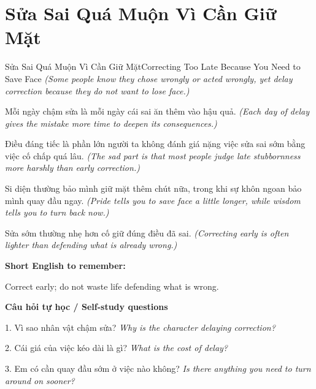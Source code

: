 \section{Sửa Sai Quá Muộn Vì Cần Giữ Mặt}
\begin{truyen}{Sửa Sai Quá Muộn Vì Cần Giữ Mặt}{Correcting Too Late Because You Need to Save Face}
\textit{(Some people know they chose wrongly or acted wrongly, yet delay correction because they do not want to lose face.)}

Mỗi ngày chậm sửa là mỗi ngày cái sai ăn thêm vào hậu quả.
\textit{(Each day of delay gives the mistake more time to deepen its consequences.)}

Điều đáng tiếc là phần lớn người ta không đánh giá nặng việc sửa sai sớm bằng việc cố chấp quá lâu.
\textit{(The sad part is that most people judge late stubbornness more harshly than early correction.)}

Si diện thường bảo mình giữ mặt thêm chút nữa, trong khi sự khôn ngoan bảo mình quay đầu ngay.
\textit{(Pride tells you to save face a little longer, while wisdom tells you to turn back now.)}

\end{truyen}

\begin{baihoc}
Sửa sớm thường nhẹ hơn cố giữ đúng điều đã sai.
\textit{(Correcting early is often lighter than defending what is already wrong.)}
\end{baihoc}

\begin{ghinhoanh}
\textbf{Short English to remember:}

Correct early; do not waste life defending what is wrong.

\end{ghinhoanh}

\begin{tuhocnhanh}
\textbf{Câu hỏi tự học / Self-study questions}

1. Vì sao nhân vật chậm sửa? \textit{Why is the character delaying correction?}

2. Cái giá của việc kéo dài là gì? \textit{What is the cost of delay?}

3. Em có cần quay đầu sớm ở việc nào không? \textit{Is there anything you need to turn around on sooner?}
\end{tuhocnhanh}
\ngancach

